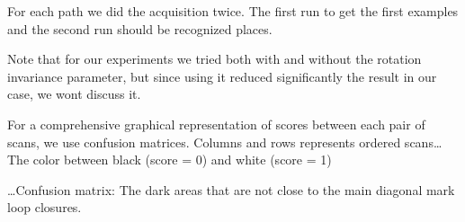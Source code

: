 For each path we did the acquisition twice. The first run to get the first examples and the second run should be recognized places.

Note that for our experiments we tried both with and without the rotation invariance parameter, but since using it reduced significantly the result in our case, we wont discuss it. 

For a comprehensive graphical representation of scores between each pair of scans, we use confusion matrices. Columns and rows represents ordered scans\dots
The color between black (score = 0) and white (score = 1)

\dots Confusion matrix: The dark areas that are not close to the main diagonal mark loop closures.

\\

